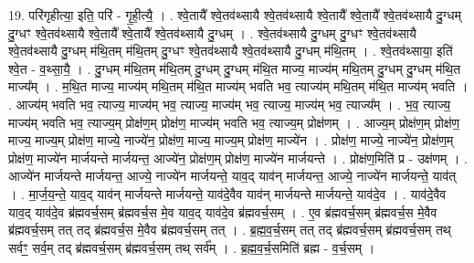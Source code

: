 \documentclass[17pt]{extarticle}
\begin{document}
19. परि॑गृहीत्या॒ इति॒ परि॑ - गृ॒ही॒त्यै॒ । . श्वे॒तायै᳚ श्वे॒तव॑थ्सायै श्वे॒तव॑थ्सायै श्वे॒तायै᳚ श्वे॒तायै᳚ श्वे॒तव॑थ्सायै दु॒ग्धम् दु॒ग्धꣳ श्वे॒तव॑थ्सायै श्वे॒तायै᳚ श्वे॒तायै᳚ श्वे॒तव॑थ्सायै दु॒ग्धम् । . श्वे॒तव॑थ्सायै दु॒ग्धम् दु॒ग्धꣳ श्वे॒तव॑थ्सायै श्वे॒तव॑थ्सायै दु॒ग्धम् म॑थि॒तम् म॑थि॒तम् दु॒ग्धꣳ श्वे॒तव॑थ्सायै श्वे॒तव॑थ्सायै दु॒ग्धम् म॑थि॒तम् । . श्वे॒तव॑थ्साया॒ इति॑ श्वे॒त - व॒थ्सा॒यै॒ । . दु॒ग्धम् म॑थि॒तम् म॑थि॒तम् दु॒ग्धम् दु॒ग्धम् म॑थि॒त माज्य॒ माज्य॑म् मथि॒तम् दु॒ग्धम् दु॒ग्धम् म॑थि॒त माज्य᳚म् । . म॒थि॒त माज्य॒ माज्य॑म् मथि॒तम् म॑थि॒त माज्य॑म् भवति भव॒ त्याज्य॑म् मथि॒तम् म॑थि॒त माज्य॑म् भवति । . आज्य॑म् भवति भव॒ त्याज्य॒ माज्य॑म् भव॒ त्याज्य॒ माज्य॑म् भव॒ त्याज्य॒ माज्य॑म् भव॒ त्याज्य᳚म् । . भ॒व॒ त्याज्य॒ माज्य॑म् भवति भव॒ त्याज्य॒म् प्रोक्ष॑ण॒म् प्रोक्ष॑ण॒ माज्य॑म् भवति भव॒ त्याज्य॒म् प्रोक्ष॑णम् । . आज्य॒म् प्रोक्ष॑ण॒म् प्रोक्ष॑ण॒ माज्य॒ माज्य॒म् प्रोक्ष॑ण॒ माज्ये॒ नाज्ये॑न॒ प्रोक्ष॑ण॒ माज्य॒ माज्य॒म् प्रोक्ष॑ण॒ माज्ये॑न । . प्रोक्ष॑ण॒ माज्ये॒ नाज्ये॑न॒ प्रोक्ष॑ण॒म् प्रोक्ष॑ण॒ माज्ये॑न मार्जयन्ते मार्जयन्त॒ आज्ये॑न॒ प्रोक्ष॑ण॒म् प्रोक्ष॑ण॒ माज्ये॑न मार्जयन्ते । . प्रोक्ष॑ण॒मिति॑ प्र - उक्ष॑णम् । . आज्ये॑न मार्जयन्ते मार्जयन्त॒ आज्ये॒ नाज्ये॑न मार्जयन्ते॒ याव॒द् याव॑न् मार्जयन्त॒ आज्ये॒ नाज्ये॑न मार्जयन्ते॒ याव॑त् । . मा॒र्ज॒य॒न्ते॒ याव॒द् याव॑न् मार्जयन्ते मार्जयन्ते॒ याव॑दे॒वैव याव॑न् मार्जयन्ते मार्जयन्ते॒ याव॑दे॒व । . याव॑दे॒वैव याव॒द् याव॑दे॒व ब्र॑ह्मवर्च॒सम् ब्र॑ह्मवर्च॒स मे॒व याव॒द् याव॑दे॒व ब्र॑ह्मवर्च॒सम् । . ए॒व ब्र॑ह्मवर्च॒सम् ब्र॑ह्मवर्च॒स मे॒वैव ब्र॑ह्मवर्च॒सम् तत् तद् ब्र॑ह्मवर्च॒स मे॒वैव ब्र॑ह्मवर्च॒सम् तत् । . ब्र॒ह्म॒व॒र्च॒सम् तत् तद् ब्र॑ह्मवर्च॒सम् ब्र॑ह्मवर्च॒सम् तथ् सर्वꣳ॒॒ सर्व॒म् तद् ब्र॑ह्मवर्च॒सम् ब्र॑ह्मवर्च॒सम् तथ् सर्व᳚म् । . ब्र॒ह्म॒व॒र्च॒समिति॑ ब्रह्म - व॒र्च॒सम् । \newline
\end{document}
